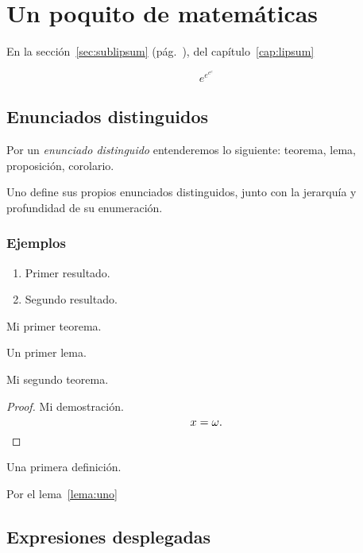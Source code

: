 \chapter{Un poquito de matemáticas}

En la sección~\ref{sec:sublipsum} (pág.~\pageref{sec:sublipsum}), del capítulo~\ref{cap:lipsum}

\begin{equation*}
  e^{e^{e^e}}
\end{equation*}

\section{Enunciados distinguidos}

Por un \emph{enunciado distinguido} entenderemos lo siguiente: teorema, lema, proposición, corolario.

Uno define sus propios enunciados distinguidos, junto con la jerarquía y profundidad de su enumeración.

\subsection{Ejemplos}

\begin{teo}
  \leavevmode
  \begin{enumerate}
    \item Primer resultado.
    \item Segundo resultado.
  \end{enumerate}
Mi primer teorema.
\end{teo}

\begin{lema}\label{lema:uno}
Un primer lema.
\end{lema}

\begin{teo}[ Cauchy]
  Mi segundo teorema.
  \end{teo}
\begin{proof}
  Mi demostración.
  \begin{equation*}
    x=\omega.\qedhere
  \end{equation*}
\end{proof}

\begin{defi}
  Una primera definición.
\end{defi}

\begin{obs}
Por el lema~\ref{lema:uno} 
\end{obs}

\section{Expresiones desplegadas}

\endinput